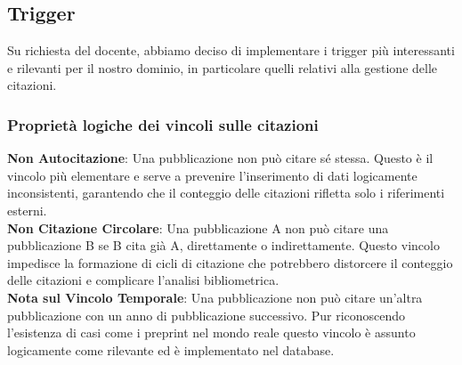 \documentclass[a4paper,12pt]{article}
\begin{document}
\subsection{Trigger} \label{subsec:trigger-citazioni}
Su richiesta del docente, abbiamo deciso di implementare i trigger più interessanti e rilevanti per il nostro dominio, in particolare quelli relativi alla gestione delle citazioni. 
\subsubsection*{Proprietà logiche dei vincoli sulle citazioni}
\textbf{Non Autocitazione}: Una pubblicazione non può citare sé stessa. Questo è il vincolo più elementare e serve a prevenire l'inserimento di dati logicamente inconsistenti, garantendo che il conteggio delle citazioni rifletta solo i riferimenti esterni.\\
\textbf{Non Citazione Circolare}: Una pubblicazione A non può citare una pubblicazione B se B cita già A, direttamente o indirettamente. Questo vincolo impedisce la formazione di cicli di citazione che potrebbero distorcere il conteggio delle citazioni e complicare l'analisi bibliometrica.\\
\textbf{Nota sul Vincolo Temporale}: Una pubblicazione non può citare un'altra pubblicazione con un anno di pubblicazione successivo. Pur riconoscendo l'esistenza di casi come i preprint nel mondo reale questo vincolo è assunto logicamente come rilevante ed è implementato nel database.\\
\end{document}
